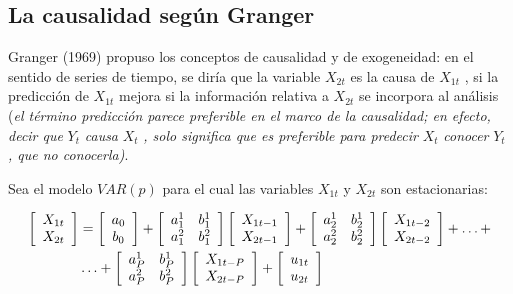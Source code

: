 \subsection{La causalidad seg\'{u}n Granger}
\label{subsubsec:mylabel12}

Granger (1969) propuso los conceptos de causalidad y de exogeneidad: en el sentido de series de tiempo, se dir\'{i}a que la variable $X_{2t}$ es la causa de $X_{1t}$ , si la predicci\'{o}n de $X_{1t}$ mejora si la informaci\'{o}n relativa a $X_{2t}$ se incorpora al an\'{a}lisis (\textit{el t\'{e}rmino predicci\'{o}n parece preferible en el marco de la causalidad; en efecto, decir que }$Y_{t}$\textit{ causa }$X_{t}$\textit{ , solo significa que es preferible para predecir }$X_{t}$\textit{ conocer }$Y_{t}$\textit{ , que no conocerla)}. 

Sea el modelo $VAR(p)$ para el cual las variables $X_{1t}$ y $X_{2t}$ son estacionarias:

\begin{align*}
\left[ {\begin{array}{c}
X_{1t}\\
X_{2t}\\
\end{array} } \right] & =\left[ {\begin{array}{c}
a_{0}\\
b_{0}\\
\end{array} } \right]+\left[ {\begin{array}{cc}
a_{1}^{1} & b_{1}^{1}\\
a_{1}^{2} & b_{1}^{2}\\
\end{array} } \right]\left[ {\begin{array}{c}
X_{1t-1}\\
X_{2t-1}\\
\end{array} } \right]+\left[ {\begin{array}{cc}
a_{2}^{1} & b_{2}^{1}\\
a_{2}^{2} & b_{2}^{2}\\
\end{array} } \right]\left[ {\begin{array}{c}
X_{1t-2}\\
X_{2t-2}\\
\end{array} } \right]+\mathellipsis +\\
& \mathellipsis + \left[ {\begin{array}{cc}
a_{P}^{1} & b_{P}^{1}\\
a_{P}^{2} & b_{P}^{2}\\
\end{array} } \right]\left[ {\begin{array}{c}
X_{1t-P}\\
X_{2t-P}\\
\end{array} } \right]+\left[ {\begin{array}{c}
u_{1t}\\
u_{2t}\\
\end{array} } \right]
\end{align*}


